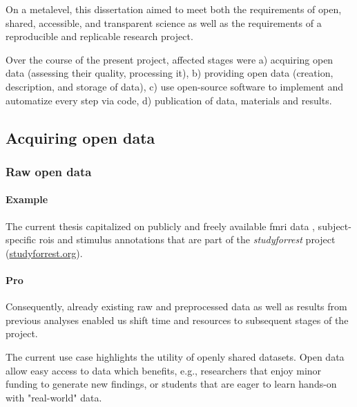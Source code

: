 On a metalevel, this dissertation aimed to meet both the requirements of open,
shared, accessible, and transparent science \citep[cf.][]{watson2015will,
fecher2014open} as well as the requirements of a reproducible and replicable
research project.

%
Over the course of the present project, affected stages were
a) acquiring open data (assessing their quality, processing it),
%
b) providing open data (creation, description, and storage of data),
%
c) use open-source software to implement and automatize every step via code,
d) publication of data, materials and results.



\subsection{Acquiring open data}


\subsubsection{Raw open data}

\paragraph{Example}

The current thesis capitalized on publicly and freely available
%
\ac{fmri} data \citep{hanke2014audiomovie, hanke2016simultaneous,
sengupta2016extension},
%
subject-specific \acp{roi} \citep{sengupta2016extension} and
%
stimulus annotations \citep{haeusler2016cutanno}
%
that are part of the \textit{studyforrest} project
(\href{www.studyforrest.org}{\url{studyforrest.org}}).


\paragraph{Pro}

%
Consequently, already existing raw and preprocessed data as well as results from
previous analyses enabled us shift time and resources to subsequent stages of
the project.

%
The current use case highlights the utility of openly shared datasets.
%
Open data allow easy access to data which benefits, e.g., researchers that enjoy
minor funding to generate new findings, or students that are eager to learn
hands-on with "real-world" data.

